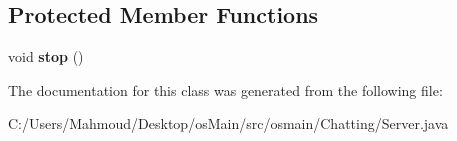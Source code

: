 \subsection*{Protected Member Functions}
\begin{DoxyCompactItemize}
\item 
void {\bfseries stop} ()\hypertarget{classosmain_1_1_chatting_1_1_server_ac31df6bca86cfb36606f3ca82abc0d5e}{}\label{classosmain_1_1_chatting_1_1_server_ac31df6bca86cfb36606f3ca82abc0d5e}

\end{DoxyCompactItemize}


The documentation for this class was generated from the following file\+:\begin{DoxyCompactItemize}
\item 
C\+:/\+Users/\+Mahmoud/\+Desktop/os\+Main/src/osmain/\+Chatting/Server.\+java\end{DoxyCompactItemize}
